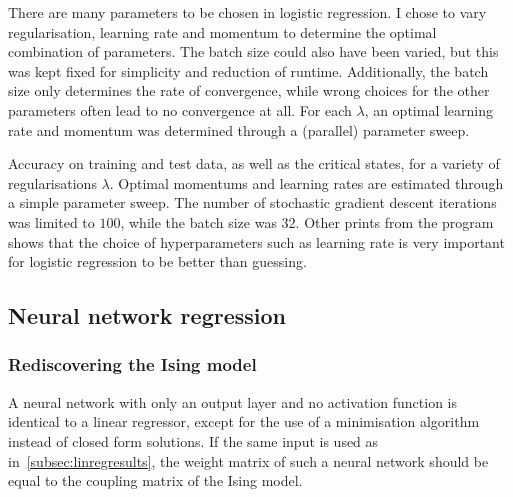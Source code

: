 \documentclass[11pt,british,a4paper]{article}
\numberwithin{equation}{section}
\begin{document}
There are many parameters to be chosen in logistic regression. I chose to vary regularisation, learning rate and momentum to determine the optimal combination of parameters. The batch size could also have been varied, but this was kept fixed for simplicity and reduction of runtime. Additionally, the batch size only determines the rate of convergence, while wrong choices for the other parameters often lead to no convergence at all. For each \(\lambda\), an optimal learning rate and momentum was determined through a (parallel) parameter sweep.

\begin{table}[H]
    \centering
    \caption{Accuracy on training and test data, as well as the critical states, for a variety of regularisations \(\lambda\). Optimal momentums and learning rates are estimated through a simple parameter sweep. The number of stochastic gradient descent iterations was limited to \(100\), while the batch size was \(32\). Other prints from the program shows that the choice of hyperparameters such as learning rate is very important for logistic regression to be better than guessing.}
\end{table}

\subsection{Neural network regression}
\subsubsection{Rediscovering the Ising model}
A neural network with only an output layer and no activation function is identical to a linear regressor, except for the use of a minimisation algorithm instead of closed form solutions.
If the same input is used as in~\vref{subsec:linregresults}, the weight matrix of such a neural network should be equal to the coupling matrix of the Ising model.
\end{document}
